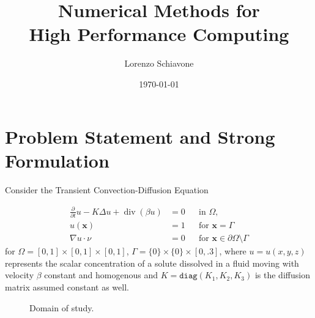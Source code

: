 \documentclass[hidelinks]{article}
\title{Numerical Methods for \\ High Performance Computing}
\author{Lorenzo Schiavone}
\date{\today}
\DeclareMathOperator{\divg}{div}
\begin{document}
\maketitle
\tableofcontents

\pagebreak

\section{Problem Statement and Strong Formulation}
Consider the Transient Convection-Diffusion Equation 

\begin{equation}\tag{$D$}\label{eq:strong}
    \begin{aligned}
    \frac{\partial}{\partial t}u -K \Delta u + \divg(\beta u) &=0 && \text{in } \Omega, \\
    u(\mathbf{x}) &= 1 && \text{for } \mathbf{x} = \Gamma  \\
    \nabla u \cdot \nu &= 0 && \text{for } \mathbf{x}\in \partial\Omega \setminus \Gamma 
\end{aligned}
\end{equation}
for $\Omega = [0,1] \times [0,1]\times [0,1]$, $\Gamma = \{0\} \times \{0\} \times [0, .3]$, where $u=u(x,y,z)$ represents the scalar concentration of a solute dissolved in a fluid moving with velocity $\beta$ constant and homogenous and $K=\texttt{diag}(K_1,K_2,K_3)$ is the diffusion matrix assumed constant as well.

\begin{figure}[H]
\begin{center}
\end{center}
\caption{Domain of study.}
\end{figure}
\end{document}
